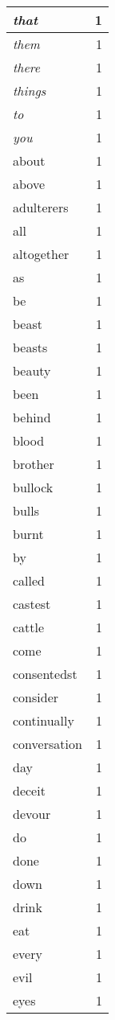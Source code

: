 \begin{center}
\begin{longtable}{l|r}
\emph{that} & 1 \\ \hline
\emph{them} & 1 \\ \hline
\emph{there} & 1 \\ \hline
\emph{things} & 1 \\ \hline
\emph{to} & 1 \\ \hline
\emph{you} & 1 \\ \hline
about & 1 \\ \hline
above & 1 \\ \hline
adulterers & 1 \\ \hline
all & 1 \\ \hline
altogether & 1 \\ \hline
as & 1 \\ \hline
be & 1 \\ \hline
beast & 1 \\ \hline
beasts & 1 \\ \hline
beauty & 1 \\ \hline
been & 1 \\ \hline
behind & 1 \\ \hline
blood & 1 \\ \hline
brother & 1 \\ \hline
bullock & 1 \\ \hline
bulls & 1 \\ \hline
burnt & 1 \\ \hline
by & 1 \\ \hline
called & 1 \\ \hline
castest & 1 \\ \hline
cattle & 1 \\ \hline
come & 1 \\ \hline
consentedst & 1 \\ \hline
consider & 1 \\ \hline
continually & 1 \\ \hline
conversation & 1 \\ \hline
day & 1 \\ \hline
deceit & 1 \\ \hline
devour & 1 \\ \hline
do & 1 \\ \hline
done & 1 \\ \hline
down & 1 \\ \hline
drink & 1 \\ \hline
eat & 1 \\ \hline
every & 1 \\ \hline
evil & 1 \\ \hline
eyes & 1 \\ \hline

\end{longtable}
\end{center}
